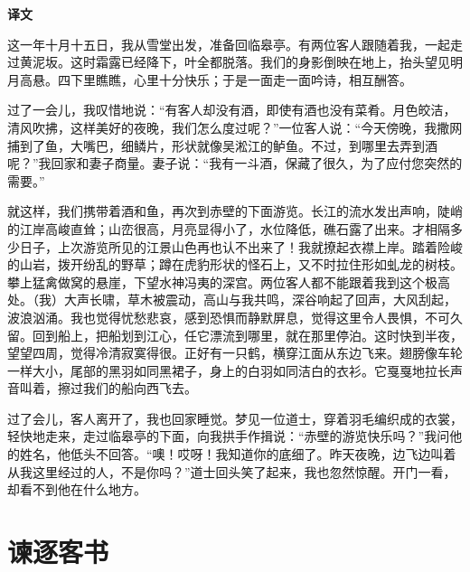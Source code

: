 \documentclass[12pt,UTF-8,openany,a4]{ctexbook}
\begin{document}
\newpage

\begin{Large}
    \noindent\textbf{译文}
\end{Large}


\vspace{1em}

\begin{large}
    \yiwen 
    这一年十月十五日，我从雪堂出发，准备回临皋亭。有两位客人跟随着我，一起走过黄泥坂。这时霜露已经降下，叶全都脱落。我们的身影倒映在地上，抬头望见明月高悬。四下里瞧瞧，心里十分快乐；于是一面走一面吟诗，相互酬答。
    
    过了一会儿，我叹惜地说：“有客人却没有酒，即使有酒也没有菜肴。月色皎洁，清风吹拂，这样美好的夜晚，我们怎么度过呢？”一位客人说：“今天傍晚，我撒网捕到了鱼，大嘴巴，细鳞片，形状就像吴淞江的鲈鱼。不过，到哪里去弄到酒呢？”我回家和妻子商量。妻子说：“我有一斗酒，保藏了很久，为了应付您突然的需要。”
    
    就这样，我们携带着酒和鱼，再次到赤壁的下面游览。长江的流水发出声响，陡峭的江岸高峻直耸；山峦很高，月亮显得小了，水位降低，礁石露了出来。才相隔多少日子，上次游览所见的江景山色再也认不出来了！我就撩起衣襟上岸。踏着险峻的山岩，拨开纷乱的野草；蹲在虎豹形状的怪石上，又不时拉住形如虬龙的树枝。攀上猛禽做窝的悬崖，下望水神冯夷的深宫。两位客人都不能跟着我到这个极高处。（我）大声长啸，草木被震动，高山与我共鸣，深谷响起了回声，大风刮起，波浪汹涌。我也觉得忧愁悲哀，感到恐惧而静默屏息，觉得这里令人畏惧，不可久留。回到船上，把船划到江心，任它漂流到哪里，就在那里停泊。这时快到半夜，望望四周，觉得冷清寂寞得很。正好有一只鹤，横穿江面从东边飞来。翅膀像车轮一样大小，尾部的黑羽如同黑裙子，身上的白羽如同洁白的衣衫。它戛戛地拉长声音叫着，擦过我们的船向西飞去。
    
    过了会儿，客人离开了，我也回家睡觉。梦见一位道士，穿着羽毛编织成的衣裳，轻快地走来，走过临皋亭的下面，向我拱手作揖说：“赤壁的游览快乐吗？”我问他的姓名，他低头不回答。“噢！哎呀！我知道你的底细了。昨天夜晚，边飞边叫着从我这里经过的人，不是你吗？”道士回头笑了起来，我也忽然惊醒。开门一看，却看不到他在什么地方。
    
\end{large}



\chapter{谏逐客书}
\end{document}
